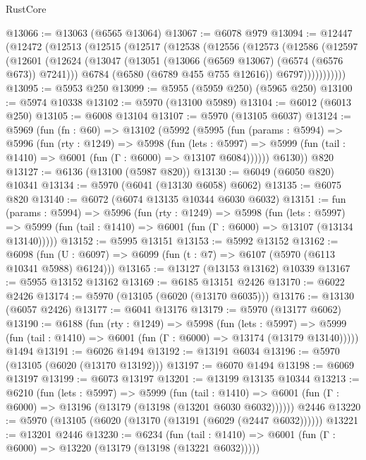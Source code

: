 \begin{lexlean}{RustCore}
\begin{coremodule}
{\begin{coremodule}
{{{{{{{{{{{{{{{{{{{{{{{{{{{{{{{{{{{{{{{{{{{{{@13066 := @13063 (@6565 @13064)
@13067 := @6078 @979
@13094 := @12447
    (@12472
      (@12513
        (@12515
          (@12517
            (@12538
              (@12556
                (@12573
                  (@12586
                    (@12597
                      (@12601
                        (@12624
                          (@13047 (@13051 (@13066 (@6569 @13067) (@6574 (@6576 @673)) @7241)))
                          @6784
                          (@6580 (@6789 @455 @755 @12616))
                          @6797)))))))))))
@13095 := @5953 @250
@13099 := @5955 (@5959 @250) (@5965 @250)
@13100 := @5974 @10338
@13102 := @5970 (@13100 @5989)
@13104 := @6012 (@6013 @250)
@13105 := @6008 @13104
@13107 := @5970 (@13105 @6037)
@13124 := @5969
    (fun (fn : @60) =>
    @13102
      (@5992
        (@5995
          (fun (params : @5994) =>
          @5996
            (fun (rty : @1249) =>
            @5998
              (fun (lets : @5997) =>
              @5999 (fun (tail : @1410) => @6001 (fun (Γ : @6000) => @13107 @6084))))))
        @6130))
    @820
@13127 := @6136 (@13100 (@5987 @820))
@13130 := @6049 (@6050 @820) @10341
@13134 := @5970 (@6041 (@13130 @6058) @6062)
@13135 := @6075 @820
@13140 := @6072 (@6074 @13135 @10344 @6030 @6032)
@13151 := fun (params : @5994) =>
  @5996
    (fun (rty : @1249) =>
    @5998
      (fun (lets : @5997) =>
      @5999 (fun (tail : @1410) => @6001 (fun (Γ : @6000) => @13107 (@13134 @13140)))))
@13152 := @5995 @13151
@13153 := @5992 @13152
@13162 := @6098
    (fun (U : @6097) => @6099 (fun (t : @7) => @6107 (@5970 (@6113 @10341 @5988) @6124)))
@13165 := @13127 (@13153 @13162) @10339
@13167 := @5955 @13152 @13162
@13169 := @6185 @13151 @2426
@13170 := @6022 @2426
@13174 := @5970 (@13105 (@6020 (@13170 @6035)))
@13176 := @13130 (@6057 @2426)
@13177 := @6041 @13176
@13179 := @5970 (@13177 @6062)
@13190 := @6188
    (fun (rty : @1249) =>
    @5998
      (fun (lets : @5997) =>
      @5999 (fun (tail : @1410) => @6001 (fun (Γ : @6000) => @13174 (@13179 @13140)))))
    @1494
@13191 := @6026 @1494
@13192 := @13191 @6034
@13196 := @5970 (@13105 (@6020 (@13170 @13192)))
@13197 := @6070 @1494
@13198 := @6069 @13197
@13199 := @6073 @13197
@13201 := @13199 @13135 @10344
@13213 := @6210
    (fun (lets : @5997) =>
    @5999
      (fun (tail : @1410) =>
      @6001 (fun (Γ : @6000) => @13196 (@13179 (@13198 (@13201 @6030 @6032))))))
    @2446
@13220 := @5970 (@13105 (@6020 (@13170 (@13191 (@6029 (@2447 @6032))))))
@13221 := @13201 @2446
@13230 := @6234
    (fun (tail : @1410) => @6001 (fun (Γ : @6000) => @13220 (@13179 (@13198 (@13221 @6032)))))
}}}}}}}}}}}}}}}}}}}}}}}}}}}}}}}}}}}}}}}}}}}}}
\end{coremodule}}
\end{coremodule}
\end{lexlean}
